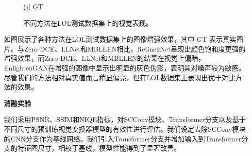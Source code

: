 \documentclass[CJK,aspectratio=169]{beamer}  %
\begin{document}
\begin{frame}
\begin{figure}
\begin{minipage}{0.19\textwidth}
			\caption*{\tiny (j) GT}
			\label{fig: GT}	
		\end{minipage}
		\captionsetup{font=scriptsize}
		\caption{
			\label{fig: LOL}
			 不同方法在LOL测试数据集上的视觉表现。
		}
	\end{figure}
	
	\vspace{-0.3cm}
	
	{ \yahei 如图展示了各种方法在LOL测试数据集上的图像增强效果，其中 GT 表示真实图片。与Zero-DCE、LLNet和MBLLEN相比，RetinexNet呈现出颜色饱和度更强的增强效果，而Zero-DCE、LLNet和MBLLEN的结果在视觉上偏暗。EnlightenGAN在增强的图像中显示出明显的灰色伪影，表明其对噪声较为敏感。尽管我们的方法相对真实值而言稍显偏亮，但在LOL数据集上表现出优于对比方法的效果。}
	
	\end{frame}
	
	\begin{frame}
		{ \yahei \textbf{消融实验}}
		
		{ \yahei 我们采用PSNR、SSIM和NIQE指标，对SCConv模块、Transformer分支以及基于不同尺寸的预训练视觉变换器模型的有效性进行评估。我们设定去除SCConv模块的CNN分支作为基线网络。我们引入Transformer分支并增加输入到Transformer分支的特征图尺寸，相较于基线，模型性能得到了显著改善。}
		
		\begin{table}[!htbp]
			\centering
			\tiny
			\captionsetup{font=scriptsize} %
			\caption{
				\label{tab: Ablation Study}
				 Transformer分支和Transformer预训练权重尺寸和SCConv对模型的影响。
			} 
		\end{table}
		
	\end{frame}
	
\end{document}
